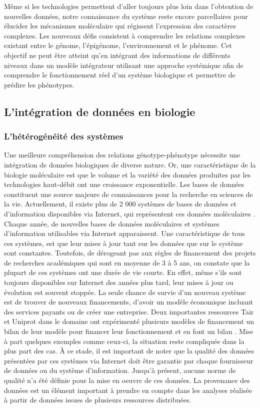  
Même si les technologies permettent d'aller toujours plus loin dans l'obtention de nouvelles données, notre connaissance du système reste encore parcellaires pour élucider les mécanismes moléculaire qui régissent l'expression des caractères complexes. Les nouveaux défis consistent à comprendre les relations complexes existant entre le génome, l'épigénome, l'environnement et le phénome. Cet objectif ne peut être atteint qu'en intégrant des informations de différents niveaux dans un modèle intégrateur utilisant une approche systémique afin de comprendre le fonctionnement réel d'un système biologique et permettre de prédire les phénotypes. 

\subsection{L'intégration de données en biologie}
\subsubsection{L'hétérogénéité des systèmes}
Une meilleure compréhension des relations génotype-phénotype nécessite une intégration de données biologiques de diverse nature. Or, une caractéristique de la biologie moléculaire est que le volume et la variété des données produites par les technologies haut-débit ont une croissance exponentielle. Les bases de données constituent une source majeure de connaissances pour la recherche en sciences de la vie. Actuellement, il existe plus de 2 000 systèmes de bases de données et d'information disponibles via Internet, qui représentent ces données moléculaires \cite{NAR2019}. Chaque année, de nouvelles bases de données moléculaires et systèmes d’information utilisables via Internet apparaissent. Une caractéristique de tous ces systèmes, est que leur mises à jour tant sur les données que sur le système sont constantes. Toutefois, de dérogeant pas aux règles de financement des projets de recherches académiques qui sont en moyenne de 3 à 5 ans, on constate que la plupart de ces systèmes ont une durée de vie courte. En effet, même s'ils sont toujours disponibles sur Internet des années plus tard, leur mises à jour ou évolution est souvent stoppée. La seule chance de survie d’un nouveau système est de trouver de nouveaux financements, d'avoir un modèle économique incluant des services payants ou de créer une entreprise. Deux importantes ressources Tair et Uniprot dans le domaine ont expérimenté plusieurs modèles de financement un bilan de leur modèle pour financer leur fonctionnement et en font un bilan \cite{TAIR_sustainable_2016,Uniprot_funding_2017}. Mise à part quelques exemples comme ceux-ci, la situation reste compliquée dans la plus part des cas.  À ce stade, il est important de noter que la qualité des données présentées par ces systèmes via Internet doit être garantie par chaque fournisseur de données ou du système d’information. Jusqu'à présent, aucune norme de qualité n'a été définie pour la mise en oeuvre de ces données. La provenance des données est un élément important à prendre en compte dans les analyses réalisée à partir de données issues de plusieurs ressources distribuées\cite{ICDE2011}.\\

